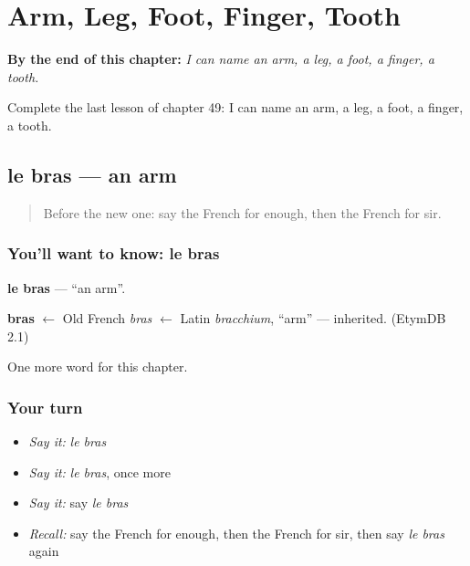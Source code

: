 
\chapter{Arm, Leg, Foot, Finger, Tooth}
\label{ch:fr-arm-leg-foot-finger-tooth}

\begin{chapteropening}
\textbf{By the end of this chapter:} \emph{I can name an arm, a leg, a foot, a finger, a tooth.}

Complete the last lesson of chapter 49: I can name an arm, a leg, a foot, a finger, a tooth.
\end{chapteropening}

\section[le bras]{le bras — an arm}

\label{lesson:FR-C49-bras}



\begin{quote}
Before the new one: say the French for enough, then the French for sir.
\end{quote}

\subsection*{You'll want to know: le bras}
\textbf{le bras} — \textquotedblleft{}an arm\textquotedblright{}.

\begin{cousinweb}
\textbf{bras} $\leftarrow$ Old French \emph{bras} $\leftarrow$ Latin \emph{bracchium}, \textquotedblleft{}arm\textquotedblright{} — inherited. (EtymDB 2.1)
\end{cousinweb}

\begin{grammarlens}[title={What you've built}]
One more word for this chapter.
\end{grammarlens}

\subsection*{Your turn}
\begin{itemize}
\raggedright
  \item \emph{Say it:} \emph{le bras}
  \item \emph{Say it:} \emph{le bras}, once more
  \item \emph{Say it:} say \emph{le bras}
  \item \emph{Recall:} say the French for enough, then the French for sir, then say \emph{le bras} again
\end{itemize}

